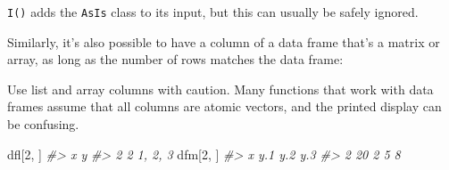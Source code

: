 \documentclass[]{book}
\newenvironment{Shaded}{\begin{snugshade}}{\end{snugshade}}
\newcommand{\KeywordTok}[1]{\textcolor[rgb]{0.13,0.29,0.53}{\textbf{#1}}}
\newcommand{\DataTypeTok}[1]{\textcolor[rgb]{0.13,0.29,0.53}{#1}}
\newcommand{\DecValTok}[1]{\textcolor[rgb]{0.00,0.00,0.81}{#1}}
\newcommand{\StringTok}[1]{\textcolor[rgb]{0.31,0.60,0.02}{#1}}
\newcommand{\CommentTok}[1]{\textcolor[rgb]{0.56,0.35,0.01}{\textit{#1}}}
\newcommand{\OperatorTok}[1]{\textcolor[rgb]{0.81,0.36,0.00}{\textbf{#1}}}
\newcommand{\NormalTok}[1]{#1}
\theoremstyle{definition}
\theoremstyle{definition}
\theoremstyle{definition}
\theoremstyle{remark}
\begin{document}
\begin{Shaded}
\end{Shaded}

\texttt{I()} adds the \texttt{AsIs} class to its input, but this can
usually be safely ignored.

Similarly, it's also possible to have a column of a data frame that's a
matrix or array, as long as the number of rows matches the data frame:

\begin{Shaded}
\end{Shaded}

Use list and array columns with caution. Many functions that work with
data frames assume that all columns are atomic vectors, and the printed
display can be confusing.

\begin{Shaded}
\begin{Highlighting}[]
\NormalTok{dfl[}\DecValTok{2}\NormalTok{, ]}
\CommentTok{#>   x       y}
\CommentTok{#> 2 2 1, 2, 3}
\NormalTok{dfm[}\DecValTok{2}\NormalTok{, ]}
\CommentTok{#>    x y.1 y.2 y.3}
\CommentTok{#> 2 20   2   5   8}
\end{Highlighting}
\end{Shaded}
\end{document}
